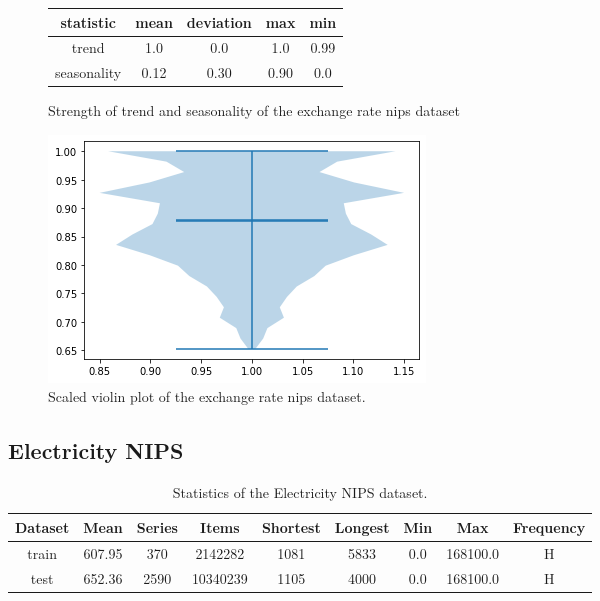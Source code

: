 \begin{figure}[htb]
  \centering
  \begin{center}
    \begin{tabular}{||c | c | c | c | c |}
      \hline
      statistic   & mean & deviation & max  & min  \\
      \hline
      trend       & 1.0  & 0.0       & 1.0  & 0.99 \\
      \hline
      seasonality & 0.12 & 0.30      & 0.90 & 0.0  \\
      \hline
      \hline
    \end{tabular}
    \caption{Strength of trend and seasonality of the exchange rate nips dataset}
  \end{center}
  \endminipage\hfill
  \includegraphics[width=\linewidth]{./img/exchange_rate_nips_violin.png}
  \caption{Scaled violin plot of the exchange rate nips dataset.}
  \label{fig:exchange_rate_nips_violin}
  \endminipage\hfill
\end{figure}

\clearpage
\subsection{Electricity NIPS}
\begin{table}[htb]
  \begin{tabular}{||c | c c c c c c c c ||}
    \hline
    Dataset & Mean   & Series & Items    & Shortest & Longest & Min & Max      & Frequency \\ [0.5ex]
    \hline\hline
    train   & 607.95 & 370    & 2142282  & 1081     & 5833    & 0.0 & 168100.0 & H         \\
    \hline
    test    & 652.36 & 2590   & 10340239 & 1105     & 4000    & 0.0 & 168100.0 & H         \\
    \hline
  \end{tabular}
  \caption{Statistics of the Electricity NIPS dataset.}
\end{table}

